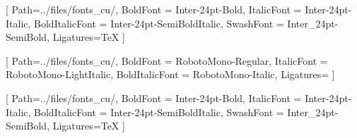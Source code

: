 \usepackage{subcaption}
\usepackage[labelsep=period, font={color=black}, figurename=Рисунок, tablename=Таблица]{caption}
\usepackage{tikz}
\usepackage{cancel}
\usepackage{booktabs}
\usepackage{stmaryrd}
\usepackage[export]{adjustbox}
\usepackage{algorithmic}
\usepackage{fontawesome5}

\usepackage{amsmath,amsfonts,amssymb,amsthm,mathtools} %

\graphicspath{{../files/}}

\newcommand{\theHalgorithm}{\arabic{algorithm}}
\usepackage[ruled,vlined]{algorithm2e}
\renewcommand{\algorithmicrequire}{\textbf{Input:}}
\renewcommand{\algorithmicensure}{\textbf{Output:}}
\newcommand{\vect}[1]{\boldsymbol{\mathbf{#1}}}

\usepackage{ifthen}

\usepackage{fontspec}




\def\fontpath{../files/fonts_cu/}

\setmainfont{Inter_24pt-Regular.ttf}[
Path={\fontpath},
BoldFont = Inter-24pt-Bold,
ItalicFont = Inter-24pt-Italic,
BoldItalicFont = Inter-24pt-SemiBoldItalic,
SwashFont = {Inter_24pt-SemiBold}, %
Ligatures=TeX
]  %


\setmonofont{RobotoMono-Light}[
Path={\fontpath},
BoldFont = RobotoMono-Regular,
ItalicFont =  RobotoMono-LightItalic,
BoldItalicFont = RobotoMono-Italic,
Ligatures={}
]



\setsansfont{Inter_24pt-Regular.ttf}[
Path={\fontpath},
BoldFont = Inter-24pt-Bold,
ItalicFont = Inter-24pt-Italic,
BoldItalicFont = Inter-24pt-SemiBoldItalic,
SwashFont = {Inter_24pt-SemiBold}, %
Ligatures=TeX
]  %

